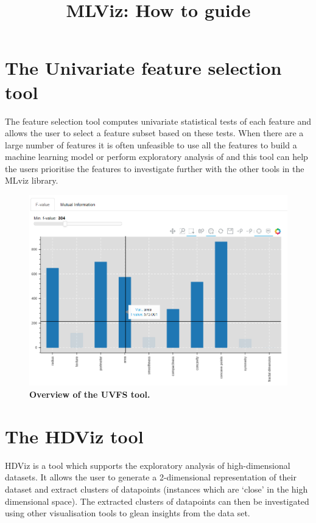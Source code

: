 \documentclass[11pt]{article} %
\title{MLViz: How to guide}
\date{} %
\begin{document}
\maketitle


\section{The Univariate feature selection tool}

The feature selection tool computes univariate statistical tests of each feature and allows the user to select a feature subset based on these tests. When there are a large number of features it is often unfeasible to use all the features to build a machine learning model or perform exploratory analysis of and this tool can help the users prioritise the features to investigate further with the other tools in the MLviz library. 

\begin{figure}[!h]
\centering
\includegraphics[width=4.5in]{images/UVFS_tool_annotated.png}
\caption{\textbf{Overview of the UVFS tool.} }
\label{fig:UVFS}
\end{figure}

\section{The HDViz tool}

HDViz is a tool which supports the exploratory analysis of high-dimensional datasets. It allows the user to generate a 2-dimensional representation of their dataset and extract clusters of datapoints (instances which are `close' in the high dimensional space). The extracted clusters of datapoints can then be investigated using other visualisation tools to glean insights from the data set.
\end{document}
